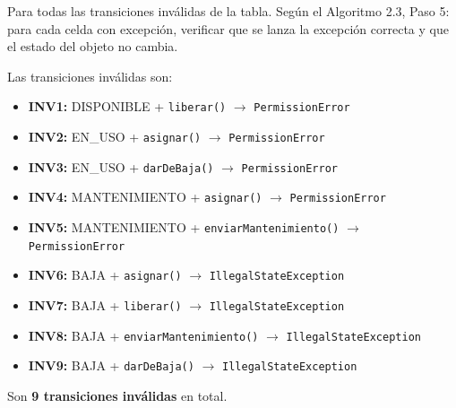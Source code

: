 Para todas las transiciones inválidas de la tabla. Según el Algoritmo 2.3, Paso 5: para cada celda con excepción, verificar que se lanza la excepción correcta y que el estado del objeto no cambia.

Las transiciones inválidas son:

\begin{itemize}
    \item \textbf{INV1:} DISPONIBLE + \texttt{liberar()} $\rightarrow$ \texttt{PermissionError}
    \item \textbf{INV2:} EN\_USO + \texttt{asignar()} $\rightarrow$ \texttt{PermissionError}
    \item \textbf{INV3:} EN\_USO + \texttt{darDeBaja()} $\rightarrow$ \texttt{PermissionError}
    \item \textbf{INV4:} MANTENIMIENTO + \texttt{asignar()} $\rightarrow$ \texttt{PermissionError}
    \item \textbf{INV5:} MANTENIMIENTO + \texttt{enviarMantenimiento()} $\rightarrow$ \texttt{PermissionError}
    \item \textbf{INV6:} BAJA + \texttt{asignar()} $\rightarrow$ \texttt{IllegalStateException}
    \item \textbf{INV7:} BAJA + \texttt{liberar()} $\rightarrow$ \texttt{IllegalStateException}
    \item \textbf{INV8:} BAJA + \texttt{enviarMantenimiento()} $\rightarrow$ \texttt{IllegalStateException}
    \item \textbf{INV9:} BAJA + \texttt{darDeBaja()} $\rightarrow$ \texttt{IllegalStateException}
\end{itemize}

Son \textbf{9 transiciones inválidas} en total.

